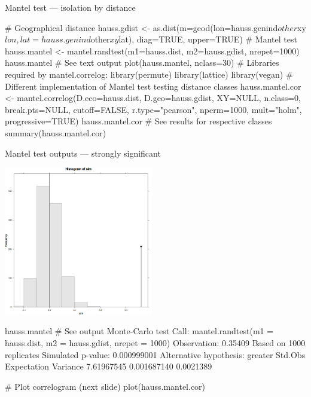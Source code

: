 \documentclass[compress, ucs, xelatex, 11pt, xcolor=svgnames, aspectratio=169,
	hyperref={
		bookmarks=true,
		unicode=true,
		colorlinks=true,
		pdftitle={Molecular data in R},
		plainpages=false,
		pdfauthor={Vojtech Zeisek},
		pdfsubject={Course about phylogeny and evolution in R},
		pdfcreator={XeLaTeX},
		pdfkeywords={R, evolution, phylogeny, molecular data},
		linkcolor=Crimson, %
		anchorcolor=Magenta, %
		citecolor=Magenta, %
		filecolor=Magenta, %
		menucolor=Magenta, %
		urlcolor=DodgerBlue, %
		pdftex},
	url={hyphens, lowtilde} %
	]{beamer}
\begin{document}
\begin{frame}[fragile]{Mantel test --- isolation by distance}
	\begin{spluscode}
    # Geographical distance
    hauss.gdist <- as.dist(m=geod(lon=hauss.genind$other$xy$lon,
      lat=hauss.genind$other$xy$lat), diag=TRUE, upper=TRUE)
    # Mantel test
    hauss.mantel <- mantel.randtest(m1=hauss.dist, m2=hauss.gdist, nrepet=1000)
    hauss.mantel # See text output
    plot(hauss.mantel, nclass=30)
    # Libraries required by mantel.correlog:
    library(permute)
    library(lattice)
    library(vegan)
    # Different implementation of Mantel test testing distance classes
    hauss.mantel.cor <- mantel.correlog(D.eco=hauss.dist, D.geo=hauss.gdist,
      XY=NULL, n.class=0, break.pts=NULL, cutoff=FALSE, r.type="pearson",
      nperm=1000, mult="holm", progressive=TRUE)
    hauss.mantel.cor # See results for respective classes
    summary(hauss.mantel.cor)
	\end{spluscode}
\end{frame}

\begin{frame}[fragile]{Mantel test outputs --- strongly significant}
	\begin{multicols}{2}
		\begin{center}
			\includegraphics[height=6.5cm]{mantel.png}
		\end{center}
		\columnbreak
		\begin{spluscode}
    hauss.mantel # See output
    Monte-Carlo test
    Call: mantel.randtest(m1 =
      hauss.dist, m2 =
      hauss.gdist, nrepet = 1000)
    Observation: 0.35409
    Based on 1000 replicates
    Simulated p-value: 0.000999001
    Alternative hypothesis: greater
      Std.Obs Expectation  Variance
    7.61967545 0.001687140 0.0021389
		\end{spluscode}
		\vfill
		\begin{spluscode}
    # Plot correlogram (next slide)
    plot(hauss.mantel.cor)
		\end{spluscode}
		\vfill
	\end{multicols}
\end{frame}
\end{document}
